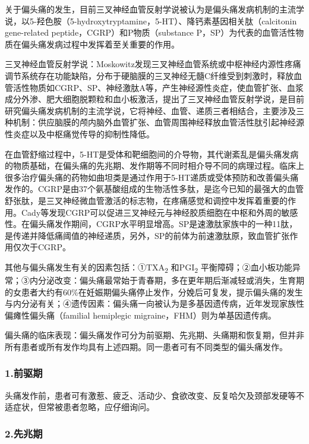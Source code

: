 关于偏头痛的发生，目前三叉神经血管反射学说被认为是偏头痛发病机制的主流学说，以5-羟色胺（5-hydroxytryptamine，5-HT）、降钙素基因相关肽（calcitonin
gene-related peptide，CGRP）和P物质（substance
P，SP）为代表的血管活性物质在偏头痛发病过程中发挥着至关重要的作用。

三叉神经血管反射学说：Moskowitz发现三叉神经血管系统或中枢神经内源性疼痛调节系统存在功能缺陷，分布于硬脑膜的三叉神经无髓C纤维受到刺激时，释放血管活性物质如CGRP、SP、神经激肽A等，产生神经源性炎症，使血管扩张、血浆成分外渗、肥大细胞脱颗粒和血小板激活，提出了三叉神经血管反射学说，是目前研究偏头痛发病机制的主流学说，它将神经、血管、递质三者相结合，主要涉及三种机制：供应脑膜的颅内脑外血管扩张、血管周围神经释放血管活性肽引起神经源性炎症以及中枢痛觉传导的抑制性降低。

在血管舒缩过程中，5-HT是受体和靶细胞间的介导物，其代谢紊乱是偏头痛发病的物质基础，在偏头痛的先兆期、发作期等不同时相介导不同的病理过程。临床上很多治疗偏头痛的药物如曲坦类是通过作用于5-HT递质或受体预防和改善偏头痛发作的。CGRP是由37个氨基酸组成的生物活性多肽，是迄今已知的最强大的血管舒张肽，是三叉神经微血管激活的标志物，在疼痛感觉和调控中发挥着重要的作用。Cady等发现CGRP可以促进三叉神经元与神经胶质细胞在中枢和外周的敏感性。在偏头痛发作期间，CGRP水平明显增高。SP是速激肽家族中的一种11肽，是传递并降低痛阈值的神经递质，另外，SP的前体为前速激肽原，致血管扩张作用仅次于CGRP。

其他与偏头痛发生有关的因素包括：①TXA\textsubscript{2}
和PGI\textsubscript{2}
平衡障碍；②血小板功能异常；③内分泌改变：偏头痛最常始于青春期，多在更年期后渐减轻或消失，生育期的女患者大约有60\%在妊娠期偏头痛停止发作，分娩后可复发，提示偏头痛的发生与内分泌有关；④遗传因素：偏头痛一向被认为是多基因遗传病，近年发现家族性偏瘫性偏头痛（familial
hemiplegic migraine，FHM）则为单基因遗传病。

偏头痛的临床表现：偏头痛发作可分为前驱期、先兆期、头痛期和恢复期，但并非所有患者或所有发作均具有上述四期。同一患者可有不同类型的偏头痛发作。

\subsubsection{1.前驱期}

头痛发作前，患者可有激惹、疲乏、活动少、食欲改变、反复哈欠及颈部发硬等不适症状，但常被患者忽略，应仔细询问。

\subsubsection{2.先兆期}

